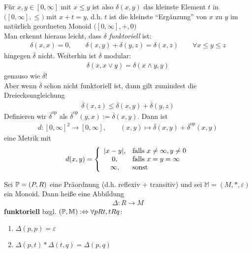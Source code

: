 \begin{bemerkung}
	Für $x,y\in[0,\infty]$ mit $x\leq y$ ist also $\delta(x,y)$ das kleinste Element $t$ in $\big([0,\infty],\leq\big)$ mit $x+t=y$, 
	d.h. $t$ ist die kleinste ``Ergänzung'' von $x$ zu $y$ im natürlich geordneten Monoid $\big([0,\infty],+,0\big)$\\
	Man erkennt hieraus leicht, dass $\delta$ \textit{funktoriell} ist:
	\begin{align*}
		\delta(x,x)=0,\qquad\delta(x,y)+\delta(y,z)=\delta (x,z)\qquad\forall x\leq y\leq z
	\end{align*}
	hingegen $\overline{\delta}$ nicht. 
	Weiterhin ist $\delta$ modular:
	\begin{align*}
		\delta(x,x\vee y)=\delta(x\wedge y,y)
	\end{align*}
	genauso wie $\overline{\delta}$!\\
	Aber wenn $\overline{\delta}$ schon nicht funktoriell ist, dann gilt zumindest die Dreiecksungleichung
	\begin{align*}
		\overline{\delta}(x,z)\leq\overline{\delta}(x,y)+\overline{\delta}(y,z)
	\end{align*}
	Definieren wir $\overline{\delta}^{\text{op}}$ als $\overline{\delta}^{\text{op}}(y,x):=\overline{\delta}(x,y)$. 
	Dann ist
	\begin{align*}
		d:[0,\infty]^2\to[0,\infty],\qquad (x,y)\mapsto\overline{\delta}(x,y)+\overline{\delta}^{\text{op}}(x,y)
	\end{align*}
	eine Metrik mit
	\begin{align*}
		d(x,y)=\left\lbrace\begin{array}{cl}
			|x-y|, &\falls x\neq\infty,y\neq0\\
			0, &\falls x=y=\infty\\
			\infty, &\sonst
		\end{array}\right.
	\end{align*}
\end{bemerkung}

\begin{definition}
	Sei $\P=(P,R)$ eine Präordnung (d.h. reflexiv + transitiv) und sei $\mathbb{M}=(M,\ast,\varepsilon)$ ein Monoid. 
	Dann heiße eine Abbildung
	\begin{align*}
		\Delta:R\to M
	\end{align*}
	\textbf{funktoriell} bzgl. $(\P,\mathbb{M}):\gdw\forall pRt, tRq$:
	\begin{enumerate}
		\item $\Delta(p,p)=\varepsilon$
		\item $\Delta(p,t)\ast\Delta(t,q)=\Delta(p,q)$
	\end{enumerate}
\end{definition}
 

